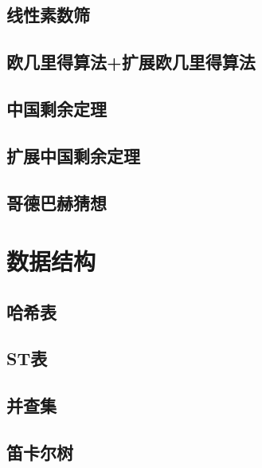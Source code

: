 \documentclass[twocolumn,a4]{article}  %
\begin{document}
	 	\subsection{线性素数筛}
	 	 	

	 	\subsection{欧几里得算法+扩展欧几里得算法}
	 	 	
	
	 	\subsection{中国剩余定理}
	 	 	
	
	 	\subsection{扩展中国剩余定理}
	 	 	
	 	 	
	 	\subsection{哥德巴赫猜想}
	 	 	
	
	\section{数据结构}
		\subsection{哈希表}
			
			
		\subsection{ST表}
	 	 	
	 	 	
	 	\subsection{并查集}
	 	 	
	 	 	
	 	\subsection{笛卡尔树}
	 	 	
\end{document}

